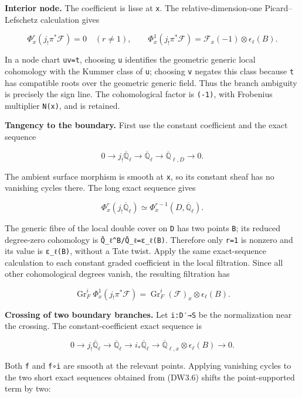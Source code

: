 \documentclass[
]{report}
\begin{document}
\textbf{Interior node.} The coefficient is lisse at \texttt{x}. The
relative-dimension-one Picard--Lefschetz calculation gives

\[
\Phi_x^r(j_!\pi^*\mathcal F)=0\quad(r\ne1),
\qquad
\Phi_x^1(j_!\pi^*\mathcal F)
=\mathcal F_x(-1)\otimes\epsilon_\ell(B).
\tag{DW3.2}
\]

In a node chart \texttt{uv=t}, choosing \texttt{u} identifies the
geometric generic local cohomology with the Kummer class of \texttt{u};
choosing \texttt{v} negates this class because \texttt{t} has compatible
roots over the geometric generic field. Thus the branch ambiguity is
precisely the sign line. The cohomological factor is \texttt{(-1)}, with
Frobenius multiplier \texttt{N(x)}, and is retained.

\textbf{Tangency to the boundary.} First use the constant coefficient
and the exact sequence

\[
0\to j_!\overline{\mathbb Q}_\ell
\to\overline{\mathbb Q}_\ell
\to\overline{\mathbb Q}_{\ell,D}\to0.
\tag{DW3.3}
\]

The ambient surface morphism is smooth at \texttt{x}, so its constant
sheaf has no vanishing cycles there. The long exact sequence gives

\[
\Phi_x^r(j_!\overline{\mathbb Q}_\ell)
\simeq\Phi_x^{r-1}(D,\overline{\mathbb Q}_\ell).
\tag{DW3.4}
\]

The generic fibre of the local double cover on \texttt{D} has two points
\texttt{B}; its reduced degree-zero cohomology is
\nolinkurl{Q̄_ℓ^B/Q̄_ℓ=ε_ℓ(B)}. Therefore only \texttt{r=1} is nonzero and
its value is \texttt{ε\_ℓ(B)}, without a Tate twist. Apply the same
exact-sequence calculation to each constant graded coefficient in the
local filtration. Since all other cohomological degrees vanish, the
resulting filtration has

\[
\operatorname{Gr}_F^i\Phi_x^1(j_!\pi^*\mathcal F)
=\operatorname{Gr}_F^i(\mathcal F)_x\otimes\epsilon_\ell(B).
\tag{DW3.5}
\]

\textbf{Crossing of two boundary branches.} Let \texttt{i:D′→S} be the
normalization near the crossing. The constant-coefficient exact sequence
is

\[
0\to j_!\overline{\mathbb Q}_\ell
\to\overline{\mathbb Q}_\ell
\to i_*\overline{\mathbb Q}_\ell
\to\overline{\mathbb Q}_{\ell,x}\otimes\epsilon_\ell(B)
\to0.
\tag{DW3.6}
\]

Both \texttt{f} and \texttt{f∘i} are smooth at the relevant points.
Applying vanishing cycles to the two short exact sequences obtained from
(DW3.6) shifts the point-supported term by two:
\end{document}
